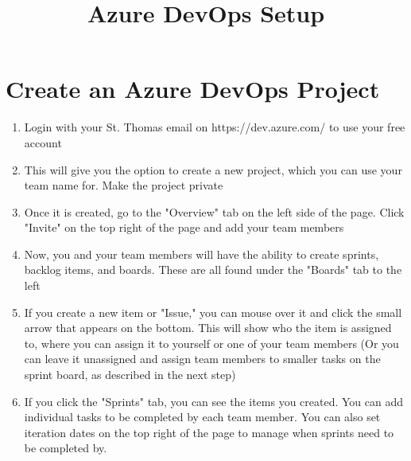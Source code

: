 \documentclass{article}
\title{Azure DevOps Setup}
\begin{document}
\maketitle



\section{Create an Azure DevOps Project}
\begin{enumerate}
    \item Login with your St. Thomas email on https://dev.azure.com/ to use your free account
    \item This will give you the option to create a new project, which you can use your team name for. Make the project private
    \item Once it is created, go to the "Overview" tab on the left side of the page. Click "Invite" on the top right of the page and add your team members
    \item Now, you and your team members will have the ability to create sprints, backlog items, and boards. These are all found under the "Boards" tab to the left
    \item If you create a new item or "Issue," you can mouse over it and click the small arrow that appears on the bottom. This will show who the item is assigned to, where you can assign it to yourself or one of your team members (Or you can leave it unassigned and assign team members to smaller tasks on the sprint board, as described in the next step)
    \item If you click the "Sprints" tab, you can see the items you created. You can add individual tasks to be completed by each team member. You can also set iteration dates on the top right of the page to manage when sprints need to be completed by.
\end{enumerate}
\end{document}
